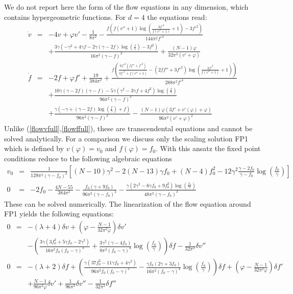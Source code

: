 \documentclass[a4paper,11pt]{revtex4}
\newcommand{\bea}{\begin{eqnarray}}
\newcommand{\eea}{\end{eqnarray}}
\newcommand{\nn}{\nonumber}
\begin{document}
We do not report here the form of the flow equations in any dimension,
which contains hypergeometric functions.
For $d=4$ the equations read:
\bea
\dot v&=&-4v+\varphi v'-\frac{1}{8\pi^2}
-\frac{f\left(f(v''+1)\log\left(\frac{3 f'^2}{f(v''+1)}+1\right)-3 f'^2\right)}{144\pi^2f'^4}
\nn\\
&&
+\frac{3\gamma\left(-\gamma^2+4\gamma f-2\gamma(\gamma-2f)\log \left(\frac{f}{\gamma}\right)
-3 f^2\right)}{16 \pi ^2 (\gamma
   -f)^3}+\frac{(N-1) \varphi }{32 \pi ^2 \left(v'+\varphi \right)}
\\
\dot f&=&-2f+\varphi f'+\frac{19}{384\pi^2}
+\frac{f\left(\frac{6f'^2\left(f f''+f'^2\right)}{3f'^2+f\left(v''+1\right)}
-\left(2 f f''+3 f'^2\right) 
\log\left(\frac{3 f'^2}{f(v''+1)}+1\right)\right)}{288 \pi ^2 f'^4}
   \nn\\&&
   +\frac{10 \gamma  (\gamma -2 f) (\gamma -f)-5
   \gamma  \left(\gamma ^2-3 \gamma  f+4 f^2\right) \log \left(\frac{f}{\gamma }\right)}{96
   \pi ^2 (\gamma -f)^3}
\nn\\&&
+\frac{\gamma\left(-\gamma +(\gamma-2f)\log\left(\frac{f}{\gamma}\right)+f\right)}{96\pi^2(\gamma-f)^2}
-\frac{(N-1) \varphi  \left(3 f'+v'(\varphi )+\varphi \right)}{96 \pi ^2 \left(v'+\varphi\right)^2}
\eea
Unlike (\ref{flowvfull},\ref{flowffull}),
these are transcendental equations and cannot be solved analytically.
For a comparison we discuss
only the  scaling solution FP1
which is defined by $v(\varphi)=v_0$ and $f(\varphi)=f_0$.
With this ansatz the fixed point conditions reduce to 
the following algebraic equations
\bea
\label{eqpureFP1}
v_0&=&\frac{1}{128\pi^2(\gamma-f_0)^2}\left[ 
(N-10)\gamma^2-2(N-13)\gamma f_0+(N-4)f_0^2
-12\gamma^2\frac{\gamma-2f_0}{\gamma-f_0}\log\left(\frac{f_0}{\gamma}\right) \right]
\nonumber\\
0&=& -2f_0-\frac{4N-55}{384\pi^2}
-\frac{f_0(\gamma+9f_0)}{96\pi^2(\gamma-f_0)^2}
-\frac{\gamma\left(2\gamma^2-6\gamma f_0+9f_0^2\right)
\log\left(\frac{f_0}{\gamma}\right)}{48\pi^2(\gamma-f_0)^3}
\eea
These can be solved numerically.
The linearization of the flow equation around FP1 yields the following
equations:
\bea
0&=& 
-(\lambda+4)\delta v 
+\left(\varphi-\frac{N-1}{32\pi^2\varphi}\right)\delta v'
\nn\\
&&
-\left(\frac{3\gamma\left(3f_0^2+5\gamma f_0-2\gamma^2\right)}
{16\pi^2f_0(f_0-\gamma)^3}
+\frac{3 \gamma ^2 (\gamma -4f_0)}{8\pi^2(f_0-\gamma)^4}\log\left(\frac{f_0}{\gamma}\right)\right)\delta f
-\frac{1}{32\pi^2}\delta v''
\\
0&=& -(\lambda +2)\delta f
+\left(\frac{\gamma\left(37 f_0^2-11\gamma f_0+4\gamma^2\right)}
{96\pi^2 f_0(f_0-\gamma)^3}
-\frac{\gamma f_0(2\gamma+3f_0)}{16\pi^2(f_0-\gamma)^4}
\log\left(\frac{f_0}{\gamma }\right)\right)\delta f
+\left(\varphi-\frac{N-1}{32\pi^2\varphi}\right)\delta f'
\nn\\
&&
+\frac{N-1}{96\pi^2\varphi}\delta v'
+\frac{1}{96\pi^2}\delta v''
-\frac{1}{32\pi^2}\delta f''
\eea
\end{document}

